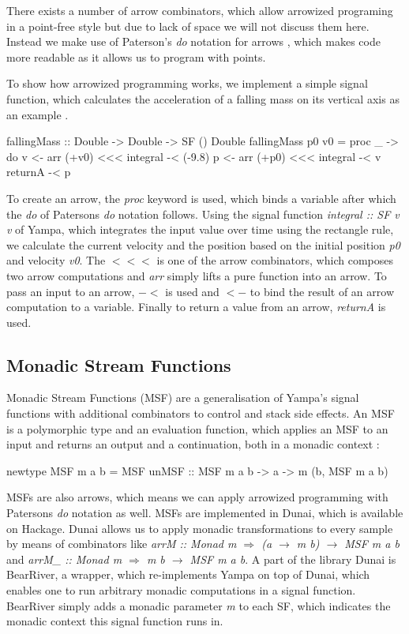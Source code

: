 There exists a number of arrow combinators, which allow arrowized programing in a point-free style but due to lack of space we will not discuss them here. Instead we make use of Paterson's \textit{do} notation for arrows \cite{paterson_new_2001}, which makes code more readable as it allows us to program with points.

To show how arrowized programming works, we implement a simple signal function, which calculates the acceleration of a falling mass on its vertical axis as an example \cite{perez_testing_2017}.

\begin{HaskellCode}
fallingMass :: Double -> Double -> SF () Double
fallingMass p0 v0 = proc _ -> do
  v <- arr (+v0) <<< integral -< (-9.8)
  p <- arr (+p0) <<< integral -< v
  returnA -< p
\end{HaskellCode}

To create an arrow, the \textit{proc} keyword is used, which binds a variable after which the \textit{do} of Patersons \textit{do} notation \cite{paterson_new_2001} follows. Using the signal function \textit{integral :: SF v v} of Yampa, which integrates the input value over time using the rectangle rule, we calculate the current velocity and the position based on the initial position \textit{p0} and velocity \textit{v0}. The $<<<$ is one of the arrow combinators, which composes two arrow computations and \textit{arr} simply lifts a pure function into an arrow. To pass an input to an arrow, $-<$ is used and $<-$ to bind the result of an arrow computation to a variable. Finally to return a value from an arrow, \textit{returnA} is used.

\subsection{Monadic Stream Functions}
\label{sec:back_msf}

Monadic Stream Functions (MSF) are a generalisation of Yampa's signal functions with additional combinators to control and stack side effects. An MSF is a polymorphic type and an evaluation function, which applies an MSF to an input and returns an output and a continuation, both in a monadic context \cite{perez_extensible_2017,perez_functional_2016}:
\begin{HaskellCode}
newtype MSF m a b = MSF {unMSF :: MSF m a b -> a -> m (b, MSF m a b)}
\end{HaskellCode}

MSFs are also arrows, which means we can apply arrowized programming with Patersons \textit{do} notation as well. MSFs are implemented in Dunai, which is available on Hackage. Dunai allows us to apply monadic transformations to every sample by means of combinators like \textit{arrM :: Monad m $\Rightarrow$ (a $\rightarrow$ m b) $\rightarrow$ MSF m a b} and \textit{arrM\_ :: Monad m $\Rightarrow$ m b $\rightarrow$ MSF m a b}. A part of the library Dunai is BearRiver, a wrapper, which re-implements Yampa on top of Dunai, which enables one to run arbitrary monadic computations in a signal function. BearRiver simply adds a monadic parameter \textit{m} to each SF, which indicates the monadic context this signal function runs in.

